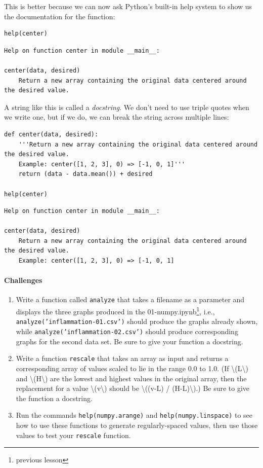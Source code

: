 \documentclass[]{book}
\newcommand{\urlfoot}[2]{{#1}\footnote{#2}}
\newcommand{\gdef}[2]{\emph{#2}}
\begin{document}
This is better because we can now ask Python's built-in help system to
show us the documentation for the function:

\begin{verbatim}
help(center)
\end{verbatim}

\begin{verbatim}
Help on function center in module __main__:

center(data, desired)
    Return a new array containing the original data centered around the desired value.
\end{verbatim}

A string like this is called a \gdef{g:docstring}{docstring}. We
don't need to use triple quotes when we write one, but if we do, we can
break the string across multiple lines:

\begin{verbatim}
def center(data, desired):
    '''Return a new array containing the original data centered around the desired value.
    Example: center([1, 2, 3], 0) => [-1, 0, 1]'''
    return (data - data.mean()) + desired

help(center)
\end{verbatim}

\begin{verbatim}
Help on function center in module __main__:

center(data, desired)
    Return a new array containing the original data centered around the desired value.
    Example: center([1, 2, 3], 0) => [-1, 0, 1]
\end{verbatim}

\mbox{}\paragraph{Challenges}

\begin{enumerate}
\item
  Write a function called \texttt{analyze} that takes a filename as a
  parameter and displays the three graphs produced in the
  \urlfoot{01-numpy.ipynb}{previous lesson}, i.e.,
  \texttt{analyze('inflammation-01.csv')} should produce the graphs
  already shown, while \texttt{analyze('inflammation-02.csv')} should
  produce corresponding graphs for the second data set. Be sure to give
  your function a docstring.
\item
  Write a function \texttt{rescale} that takes an array as input and
  returns a corresponding array of values scaled to lie in the range 0.0
  to 1.0. (If \textbackslash{}(L\textbackslash{}) and
  \textbackslash{}(H\textbackslash{}) are the lowest and highest values
  in the original array, then the replacement for a value
  \textbackslash{}(v\textbackslash{}) should be \textbackslash{}((v-L) /
  (H-L)\textbackslash{}).) Be sure to give the function a docstring.
\item
  Run the commands \texttt{help(numpy.arange)} and
  \texttt{help(numpy.linspace)} to see how to use these functions to
  generate regularly-spaced values, then use those values to test your
  \texttt{rescale} function.
\end{enumerate}
\end{document}
